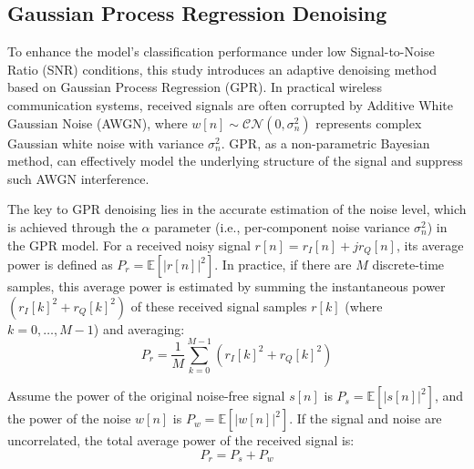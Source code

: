 \documentclass[conference]{IEEEtran}
\begin{document}
\subsection{Gaussian Process Regression Denoising}

To enhance the model's classification performance under low Signal-to-Noise Ratio (SNR) conditions, this study introduces an adaptive denoising method based on Gaussian Process Regression (GPR). In practical wireless communication systems, received signals are often corrupted by Additive White Gaussian Noise (AWGN), where $w[n] \sim \mathcal{CN}(0, \sigma_n^2)$ represents complex Gaussian white noise with variance $\sigma_n^2$. GPR, as a non-parametric Bayesian method, can effectively model the underlying structure of the signal and suppress such AWGN interference.

The key to GPR denoising lies in the accurate estimation of the noise level, which is achieved through the $\alpha$ parameter (i.e., per-component noise variance $\sigma_n^2$) in the GPR model. For a received noisy signal $r[n]=r_I[n]+jr_Q[n]$, its average power is defined as $P_r = \mathbb{E}[|r[n]|^2]$. In practice, if there are $M$ discrete-time samples, this average power is estimated by summing the instantaneous power $(r_I[k]^2 + r_Q[k]^2)$ of these received signal samples $r[k]$ (where $k=0, \ldots, M-1$) and averaging:
\begin{equation}
P_r = \frac{1}{M}\sum_{k=0}^{M-1}(r_I[k]^2+r_Q[k]^2)
\end{equation}

Assume the power of the original noise-free signal $s[n]$ is $P_s = \mathbb{E}[|s[n]|^2]$, and the power of the noise $w[n]$ is $P_w = \mathbb{E}[|w[n]|^2]$. If the signal and noise are uncorrelated, the total average power of the received signal is:
\begin{equation}
P_r = P_s + P_w
\end{equation}
\end{document}
